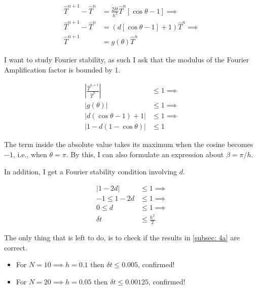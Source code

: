 \begin{align*}
	\hat{T}^{n+1} - \hat{T}^{n} &= \frac{2 \delta t}{h^2} \hat{T}^{n} \left[ \cos{\theta} -1 \right] \implies \\
	\hat{T}^{n+1} - \hat{T}^{n} &= \left( d \left[ \cos{\theta} -1 \right] + 1 \right) \hat{T}^{n} \implies \\
	\hat{T}^{n+1} &= g(\theta) \hat{T}^{n}
\end{align*}

I want to study Fourier stability, as such I ask that the modulus of the Fourier Amplification factor is bounded by 1.

\begin{align*}
	\left| \frac{\hat{T}^{n+1}}{\hat{T}^{n}} \right| &\leq 1 \implies \\
	\left| g(\theta) \right| &\leq 1 \implies \\
	\left| d(\cos\theta - 1) + 1 \right| &\leq 1 \implies \\
	\left| 1 - d(1-\cos\theta) \right| &\leq 1 
\end{align*}

The term inside the absolute value takes its maximum when the cosine becomes \( -1 \), i.e., when \( \theta = \pi \). By this, I can also formulate an expression about \( \beta = \pi/h\). 

In addition, I get a Fourier stability condition involving \(d\).

\begin{align*}
	\left| 1 - 2d \right| &\leq 1 \implies \\
	-1 \leq 1 - 2d &\leq 1 \implies \\
	0 \leq d &\leq 1 \implies \\
	\delta t &\leq  \frac{h^2}{2}
\end{align*}

The only thing that is left to do, is to check if the results in \ref{subsec: 4a} are correct.

\begin{itemize}
	\item For \(N=10 \implies h = 0.1\) then \( \delta t \leq 0.005 \), confirmed!
	\item For \(N=20 \implies h = 0.05\) then \( \delta t \leq 0.00125 \), confirmed!
\end{itemize}
